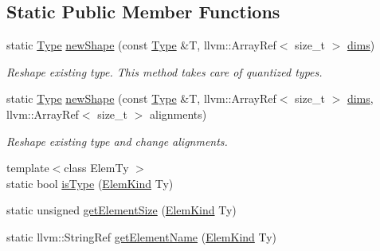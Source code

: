 \subsection*{Static Public Member Functions}
\begin{DoxyCompactItemize}
\item 
\mbox{\label{structglow_1_1_type_a088a806fc60957fa585a4b183fe5d635}} 
static \hyperlink{structglow_1_1_type}{Type} \hyperlink{structglow_1_1_type_a088a806fc60957fa585a4b183fe5d635}{new\+Shape} (const \hyperlink{structglow_1_1_type}{Type} \&T, llvm\+::\+Array\+Ref$<$ size\+\_\+t $>$ \hyperlink{structglow_1_1_type_abf3890a5fdcd39b5c221a513a15c5461}{dims})
\begin{DoxyCompactList}\small\item\em Reshape existing type. This method takes care of quantized types. \end{DoxyCompactList}\item 
\mbox{\label{structglow_1_1_type_a90947724fc317e427e461baff9e422b3}} 
static \hyperlink{structglow_1_1_type}{Type} \hyperlink{structglow_1_1_type_a90947724fc317e427e461baff9e422b3}{new\+Shape} (const \hyperlink{structglow_1_1_type}{Type} \&T, llvm\+::\+Array\+Ref$<$ size\+\_\+t $>$ \hyperlink{structglow_1_1_type_abf3890a5fdcd39b5c221a513a15c5461}{dims}, llvm\+::\+Array\+Ref$<$ size\+\_\+t $>$ alignments)
\begin{DoxyCompactList}\small\item\em Reshape existing type and change alignments. \end{DoxyCompactList}\item 
{\footnotesize template$<$class Elem\+Ty $>$ }\\static bool \hyperlink{structglow_1_1_type_ac2cf6671bd0fec4a8a2cd2c7686c9f75}{is\+Type} (\hyperlink{namespaceglow_ab92e14a94329daf4083db670e95fbcdf}{Elem\+Kind} Ty)
\item 
static unsigned \hyperlink{structglow_1_1_type_acaccb7d7d0d86e9599ba6a8720fcc101}{get\+Element\+Size} (\hyperlink{namespaceglow_ab92e14a94329daf4083db670e95fbcdf}{Elem\+Kind} Ty)
\item 
static llvm\+::\+String\+Ref \hyperlink{structglow_1_1_type_a365405b8b6b16574cb2c30545508ff3e}{get\+Element\+Name} (\hyperlink{namespaceglow_ab92e14a94329daf4083db670e95fbcdf}{Elem\+Kind} Ty)
\end{DoxyCompactItemize}
